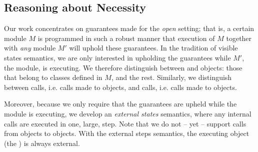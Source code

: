 \renewcommand{\sophia}[2][]{\ponders{Sophia}{blue}{#1} \textcolor{blue}{#2}\xspace}
\renewcommand{\sophia}[2][]{{}}



\subsection{Reasoning about Necessity}
\label{s:approach}

Our work concentrates on guarantees made for the \emph{open} setting; that is, a certain module
$M$ is programmed in such a robust manner
 that execution of $M$ together with \emph{any} \externalM 
module $M'$ will uphold these guarantees. In the tradition of
visible states semantics, we are  only interested in upholding the guarantees while 
$M'$, the  \externalM module,  is executing.   
 We therefore distinguish between \emph{\internalO} and
\emph{\externalO} objects: those that belong to classes defined in $M$, and the rest. Similarly, we 
distinguish between \emph{\internalC} calls, i.e. calls made %
 to \internalO objects, and \emph{\externalC} calls, i.e. calls made %
 to \externalC objects. %


Moreover, because we only require that the guarantees are upheld while 
  the  \externalM module  is executing, we develop an \emph{external states} semantics, \sophia{I like the term} where
 any internal calls are executed in one, large, step.
 Note that we do not -- yet -- support calls from
\internalO objects to \externalO objects.\sophia[we need to think where our system forbids that, ... ?]{} 
 With the external steps semantics,  the executing object (the ) is always   external. 
 

